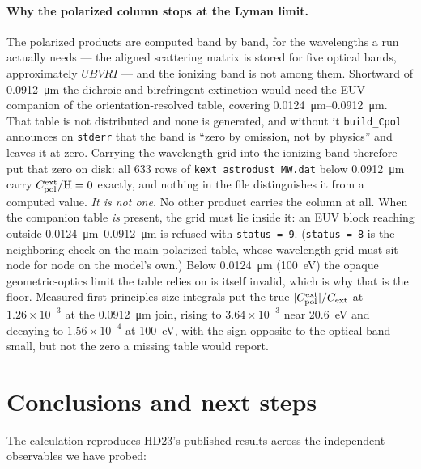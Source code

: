 \documentclass{my_memo}
\begin{document}
\paragraph{Why the polarized column stops at the Lyman limit.}
The polarized products are computed band by band, for the wavelengths a
run actually needs --- the aligned scattering matrix is stored for five
optical bands, approximately $UBVRI$ --- and the ionizing band is not
among them. Shortward of \SI{0.0912}{\micro\meter} the dichroic and
birefringent extinction would need the EUV companion of the
orientation-resolved table, covering
\SIrange{0.0124}{0.0912}{\micro\meter}. That table is not distributed
and none is generated, and without it
\texttt{build\_Cpol} announces on \texttt{stderr} that the band is
``zero by omission, not by physics'' and leaves it at zero. Carrying
the wavelength grid into the ionizing band therefore put that zero on
disk: all $633$ rows of \texttt{kext\_astrodust\_MW.dat} below
\SI{0.0912}{\micro\meter} carry $C_{\rm pol}^{\rm ext}/{\rm H} = 0$
exactly, and nothing in the file distinguishes it from a computed
value. \emph{It is not one.} No other product carries the column at
all. When the companion
table \emph{is} present, the grid must lie inside it: an EUV block
reaching outside \SIrange{0.0124}{0.0912}{\micro\meter} is refused with
\texttt{status = 9}. (\texttt{status = 8} is the neighboring check on
the main polarized table, whose wavelength grid must sit node for node
on the model's own.) Below \SI{0.0124}{\micro\meter}
(\SI{100}{\electronvolt}) the opaque geometric-optics limit the table
relies on is itself invalid, which is why that is the floor. Measured
first-principles size integrals put the true
$|C_{\rm pol}^{\rm ext}|/C_{\rm ext}$ at $1.26\times10^{-3}$ at the
\SI{0.0912}{\micro\meter} join, rising to $3.64\times10^{-3}$ near
\SI{20.6}{\electronvolt} and decaying to $1.56\times10^{-4}$ at
\SI{100}{\electronvolt}, with the sign opposite to the optical band ---
small, but not the zero a missing table would report.

\clearpage
\section{Conclusions and next steps}

The calculation reproduces HD23's published results across the
independent observables we have probed:
\end{document}
